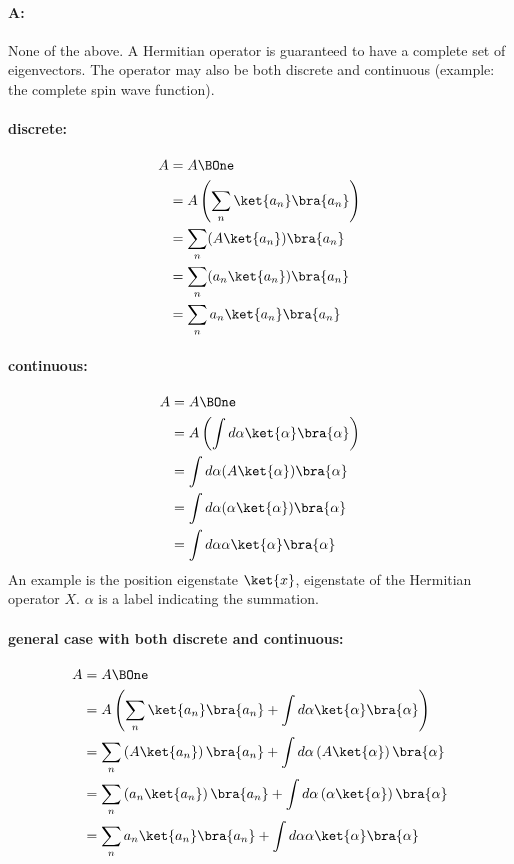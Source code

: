 \paragraph{A:} None of the above.  A Hermitian operator is guaranteed to have a complete set of eigenvectors.  The operator may also be both discrete and continuous (example: the complete spin wave function).

\paragraph{discrete:}
%
\begin{equation}\label{eqn:lecture8makingSenseOfQM:1020}
\begin{aligned}
A &= A \BOne \\
&= A \left( \sum_n \ket{a_n} \bra{a_n} \right) \\
&= \sum_n (A \ket{a_n} )\bra{a_n} \\
&= \sum_n (a_n \ket{a_n}) \bra{a_n} \\
&= \sum_n a_n \ket{a_n} \bra{a_n}
\end{aligned}
\end{equation}
%
\paragraph{continuous:}
%
\begin{equation}\label{eqn:lecture8makingSenseOfQM:1040}
\begin{aligned}
A &= A \BOne \\
&= A \left( \int d\alpha \ket{\alpha} \bra{\alpha} \right) \\
&= \int d\alpha (A \ket{\alpha} )\bra{\alpha} \\
&= \int d\alpha (\alpha \ket{\alpha}) \bra{\alpha} \\
&= \int d\alpha \alpha \ket{\alpha} \bra{\alpha}
\end{aligned}
\end{equation}
%
An example is the position eigenstate \(\ket{x}\), eigenstate of the Hermitian operator \(X\).  \(\alpha\) is a label indicating the summation.

\paragraph{general case with both discrete and continuous:}
%
\begin{equation}\label{eqn:lecture8makingSenseOfQM:1060}
\begin{aligned}
A &= A \BOne \\
&= A \left( \sum_n \ket{a_n} \bra{a_n} + \int d\alpha \ket{\alpha} \bra{\alpha} \right) \\
&= \sum_n \left(A \ket{a_n} \right)\bra{a_n} + \int d\alpha \left(A \ket{\alpha} \right)\bra{\alpha} \\
&= \sum_n \left(a_n \ket{a_n}\right) \bra{a_n} + \int d\alpha \left(\alpha \ket{\alpha}\right) \bra{\alpha} \\
&= \sum_n a_n \ket{a_n} \bra{a_n} + \int d\alpha \alpha \ket{\alpha} \bra{\alpha}
\end{aligned}
\end{equation}
%

